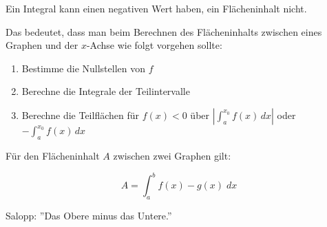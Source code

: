 \documentclass{article}
\begin{document}
Ein Integral kann einen negativen Wert haben,
ein Flächeninhalt nicht.

Das bedeutet, dass man beim Berechnen des Flächeninhalts
zwischen eines Graphen und der $x$-Achse wie folgt vorgehen
sollte:
\begin{enumerate}
    \item Bestimme die Nullstellen von $f$
    \item Berechne die Integrale der Teilintervalle
    \item Berechne die Teilflächen für $f(x)<0$ über 
    $\displaystyle \left|\int_{a}^{x_0} f(x) \, dx\right|$
    oder $\displaystyle - \int_{a}^{x_0} f(x) \, dx$
\end{enumerate}

Für den Flächeninhalt $A$ zwischen zwei Graphen gilt:

\[A = \int_a^b f(x) - g(x) \; dx\]

Salopp: ''Das Obere minus das Untere.''
\end{document}
